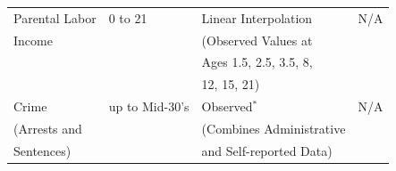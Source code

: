 \documentclass[static]{JJH-Beamer}
\begin{document}
\begin{frame}
\begin{table}[H]
\begin{center}
{\begin{tabular}{llll}
Parental Labor & 0 to 21  & Linear Interpolation     & N/A  \\
     Income       &               & (Observed Values at  &    \\
                        &               & Ages 1.5, 2.5, 3.5, 8,   &    \\
                        &               & 12, 15, 21)         &            \\  \midrule

Crime              & up to Mid-30's &  Observed$^*$    & N/A                \\
(Arrests and    &                       & (Combines Administrative & \\
 Sentences)    &                        &   and Self-reported Data) &  \\ \bottomrule
\end{tabular}
}
\end{center}
\end{table}

\end{frame}
\end{document}
